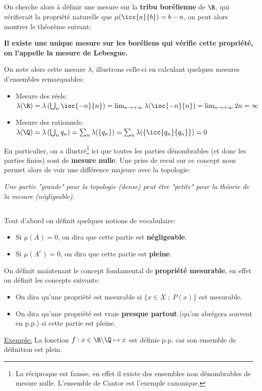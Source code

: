 \subsection*{}
On cherche alors à définir une mesure sur la \textbf{tribu borélienne} de \(\R\), qui vérifierait la propriété naturelle que \(\mu(\icc{a}{b}) = b - a\), on peut alors montrer le théorème suivant:
\begin{center}
   \textbf{Il existe une unique mesure sur les boréliens qui vérifie cette propriété, on l'appelle la mesure de Lebesgue.}
\end{center}
On note alors cette mesure \(\lambda\), illustrons celle-ci en calculant quelques mesures d'ensembles remarquables:
\begin{itemize}
   \item Mesure des réels: \(\lambda(\R) = \lambda\left(\bigcup_n \ioc{-n}{n}\right) = \lim_{n \rightarrow +\infty}\lambda(\ioc{-n}{n}) = \lim_{n \rightarrow +\infty} 2n = \infty\)
   \item Mesure des rationnels: \(\lambda(\Q) = \lambda\left(\bigcup_n q_n\right) = \sum_n \lambda(\{q_n\}) = \sum_n \lambda(\{\icc{q_n}{q_n}\}) = 0\)
\end{itemize}
En particulier, on a illustré\footnote[1]{La réciproque est fausse, en effet il existe des ensembles non dénombrables de mesure nulle. L'ensemble de Cantor est l'exemple canonique.} ici que toutes les parties dénombrables (et donc les parties finies) sont de \textbf{mesure nulle}. Une prise de recul sur ce concept nous permet alors de voir une différence majeure avec la topologie:
\begin{center}
   \textit{Une partie "grande" pour la topologie (dense) peut être "petite" pour la théorie de la mesure (négligeable).}
\end{center}
\subsection*{}
Tout d'abord on définit quelques notions de vocabulaire:
\begin{itemize}
   \item Si \(\mu(A) = 0\), on dira que cette partie est \textbf{négligeable}.
   \item Si \(\mu(A^c) = 0\), on dira que cette partie est \textbf{pleine}.
\end{itemize}
On définit maintenant le concept fondamental de \textbf{propriété mesurable}, en effet on définit les concepts suivants:
\begin{itemize}
   \item On dira qu'une propriété est mesurable si \(\{x \in X \; ; \; P(x)\}\) est mesurable.
   \item On dira qu'une propriété est vraie \textbf{presque partout} (qu'on abrégera souvent en p.p.) si cette partie est pleine.
\end{itemize}
\uline{Exemple:} La fonction \(f : x \in \R \backslash \Q \mapsto x\) est définie p.p. car son ensemble de définition est plein.


